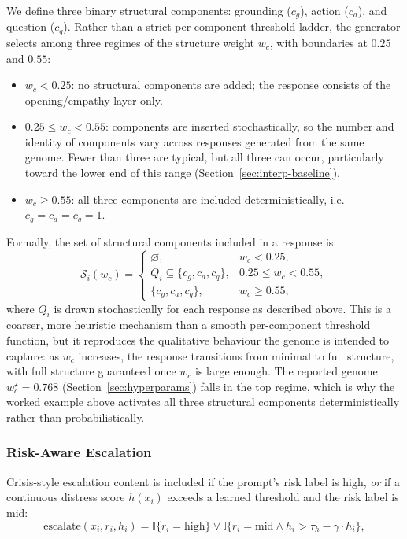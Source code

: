 \documentclass[mathematics,article,submit,xetex,moreauthors]{Definitions/mdpi}
\begin{document}
We define three binary structural components: grounding (\(c_g\)), action
(\(c_a\)), and question (\(c_q\)). Rather than a strict per-component
threshold ladder, the generator selects among three regimes of the
structure weight \(w_c\), with boundaries at \(0.25\) and \(0.55\):
\begin{itemize}
  \item \(w_c < 0.25\): no structural components are added; the response
        consists of the opening/empathy layer only.
  \item \(0.25 \le w_c < 0.55\): components are inserted stochastically,
        so the number and identity of components vary across responses
        generated from the same genome. Fewer than three are typical, but
        all three can occur, particularly toward the lower end of this
        range (Section~\ref{sec:interp-baseline}).
  \item \(w_c \ge 0.55\): all three components are included deterministically,
        i.e.\ \(c_g = c_a = c_q = 1\).
\end{itemize}
Formally, the set of structural components included in a response is
\begin{equation}
\label{eq:structure-regime}
  \mathcal{S}_i(w_c) =
  \begin{cases}
    \varnothing, & w_c < 0.25,\\
    Q_i \subseteq \{c_g, c_a, c_q\}, & 0.25 \le w_c < 0.55,\\
    \{c_g, c_a, c_q\}, & w_c \ge 0.55,
  \end{cases}
\end{equation}
where $Q_i$ is drawn stochastically for each response as described above.
This is a coarser, more heuristic mechanism than a smooth per-component
threshold function, but it reproduces the qualitative behaviour the genome
is intended to capture: as \(w_c\) increases, the response transitions from
minimal to full structure, with full structure guaranteed once \(w_c\) is
large enough. The reported genome \(w_c^{\star} = 0.768\)
(Section~\ref{sec:hyperparams}) falls in the top regime, which is why the
worked example above activates all three structural components
deterministically rather than probabilistically.

\subsubsection{Risk-Aware Escalation}
\label{sec:risk-escalation}

Crisis-style escalation content is included if the prompt's risk label is high,
\textit{or} if a continuous distress score $h(x_i)$ exceeds a learned threshold
and the risk label is mid:
\begin{equation}
  \label{eq:risk-escalation}
    \text{escalate}(x_i, r_i, h_i) = \mathbb{I}\{ r_i = \mathrm{high} \} \vee
    \mathbb{I}\{ r_i = \mathrm{mid} \land h_i > \tau_h - \gamma \cdot h_i \},
\end{equation}
\end{document}
